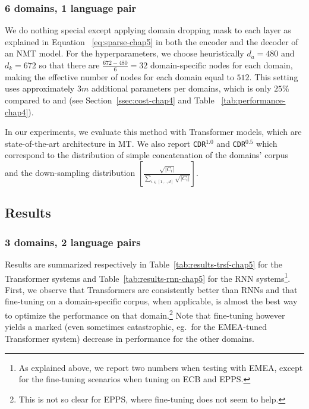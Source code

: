 \subsubsection{6 domains, 1 language pair}
We do nothing special except applying domain dropping mask to each layer as explained in Equation ~\eqref{eq:sparse-chap5} in both the encoder and the decoder of an NMT model. For the hyperparameters, we choose heuristically $d_a = 480$ and $d_k = 672$ so that there are $\frac{672-480}{6} = 32$ domain-specific nodes for each domain, making the effective number of nodes for each domain equal to $512$. This setting uses approximately $3m$ additional parameters per domains, which is only $25\%$ compared to  and  (see Section~\ref{ssec:cost-chap4} and Table ~\ref{tab:performance-chap4}).

In our experiments, we evaluate this method with Transformer models, which are state-of-the-art architecture in MT. We also report \texttt{CDR}$^{1.0}$ and \texttt{CDR}$^{0.5}$ which correspond to the distribution of simple concatenation of the domains' corpus and the down-sampling distribution $[\frac{\sqrt{|C_i|}}{\sum_{i\in [1,..,d]}\sqrt{|C_i|}}]$.

\subsection{Results \label{ssec:results-chap5}}
\subsubsection{3 domains, 2 language pairs}
\label{sssection:3domain-chap5}
Results are summarized respectively in Table~\ref{tab:results-trsf-chap5} for the Transformer systems and Table~\ref{tab:results-rnn-chap5} for the RNN systems\footnote{As explained above, we  report two numbers when testing with EMEA, except for the fine-tuning scenarios when tuning on ECB and EPPS.}. First, we observe that Transformers are consistently better than RNNs and that fine-tuning on a domain-specific corpus, when applicable, is almost the best way to optimize the performance on that domain.\footnote{This is not so clear for EPPS, where fine-tuning does not seem to help.}  
Note that fine-tuning however yields a marked (even sometimes catastrophic, eg.\ for the EMEA-tuned Transformer system) decrease in performance for the other domains. 

